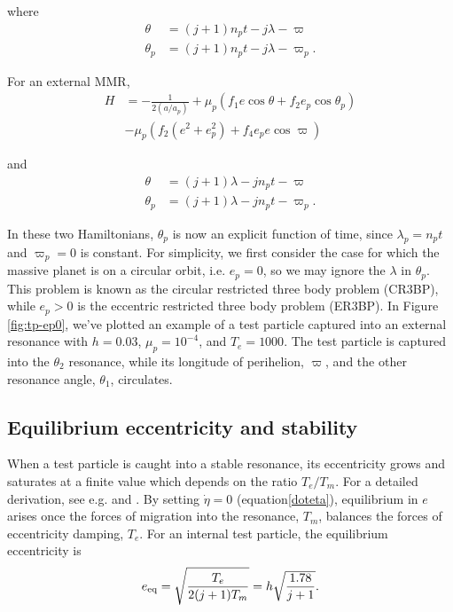 \documentclass[usenatbib,onecolumn]{mnras}
\begin{document}
\noindent
where
\begin{align}
  \theta &= (j+1)n_p t - j\lambda - \varpi \\
  \theta_p &= (j+1)n_p t - j\lambda - \varpi_p.
\end{align}

\noindent
For an external MMR, 
\begin{align*}
  \label{eq:tpext}
  H
  &= - \frac{1}{2(a/a_p)} + \mu_p\left(f_1
    e\cos\theta +f_2
    e_p\cos\theta_p\right) \\
  &- \mu_p \left(f_2\left(e^2
      + e_p^2\right) + f_4e_p
    e\cos\varpi\right)
\end{align*}

\noindent
and
\begin{align}
  \theta &= (j+1)\lambda - jn_pt - \varpi \\
  \theta_p &= (j+1)\lambda - jn_pt - \varpi_p.
\end{align}

In these two Hamiltonians, \(\theta_p\) is now an explicit function of
time, since \(\lambda_p=n_p t\) and \(\varpi_p=0\) is constant.  For
simplicity, we first consider the case for which the massive planet is
on a circular orbit, i.e. \(e_p=0\), so we may ignore the \(\lambda\) in
\(\theta_p\). This problem is known as the circular restricted three
body problem (CR3BP), while \(e_p>0\) is the eccentric restricted three
body problem (ER3BP).  In Figure \ref{fig:tp-ep0}, we've plotted an
example of a test particle captured into an external resonance with
\(h=0.03\), \(\mu_p = 10^{-4}\), and \(T_{e} = 1000\).  The test particle is
captured into the \(\theta_2\) resonance, while its longitude of
perihelion, \(\varpi\), and the other resonance angle, \(\theta_1\),
circulates.

\subsection{Equilibrium eccentricity and stability}
\label{sec:org2a3728e}
When a test particle is caught into a stable resonance, its
eccentricity grows and saturates at a finite value which depends on
the ratio \(T_{e}/T_{m}\).  For a detailed derivation, see e.g.
\citep{goldreich_overstable_2014} and \citep{xu_migration_2018}.
By setting \(\dot\eta=0\) (equation\ref{doteta}), equilibrium
in \(e\) arises once the forces of migration into the resonance, \(T_m\), balances
the forces of eccentricity damping, \(T_e\). For an internal
test particle, the equilibrium eccentricity is
\begin{equation}
\label{eq:eeqint}
  e_{\rm eq} = \sqrt{\frac{T_e}{2(j+1)T_m}} = h\sqrt{\frac{1.78}{j+1}}.
\end{equation}
\end{document}
